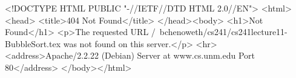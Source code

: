 <!DOCTYPE HTML PUBLIC "-//IETF//DTD HTML 2.0//EN">
<html><head>
<title>404 Not Found</title>
</head><body>
<h1>Not Found</h1>
<p>The requested URL /~bchenoweth/cs241/cs241lecture11-BubbleSort.tex was not found on this server.</p>
<hr>
<address>Apache/2.2.22 (Debian) Server at www.cs.unm.edu Port 80</address>
</body></html>
